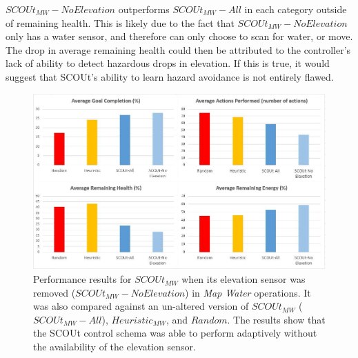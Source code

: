 \noindent
$SCOUt_{MW} - No Elevation$ outperforms $SCOUt_{MW} - All$ in each category outside of remaining health.
This is likely due to the fact that $SCOUt_{MW} - No Elevation$ only has a water sensor, and therefore can only choose to scan for water, or move.
The drop in average remaining health could then be attributed to the controller's lack of ability to detect hazardous drops in elevation.
If this is true, it would suggest that SCOUt's ability to learn hazard avoidance is not entirely flawed.

\begin{figure}[H]
  \centering
  \includegraphics[width=1.0\columnwidth]{Figures/Results/Experiment2/SensorChange/MapWater.JPG}
  \caption[Experiment 2 - Sensor Set Changing Results: $SCOUt_{MW}$]{Performance results for $SCOUt_{MW}$ when its elevation sensor was removed ($SCOUt_{MW} - No Elevation$) in \textit{Map Water} operations. It was also compared against an un-altered version of $SCOUt_{MW}$ ($SCOUt_{MW} - All$), $Heuristic_{MW}$, and $Random$. The results show that the SCOUt control schema was able to perform adaptively without the availability of the elevation sensor.}
  \label{fig:change_sensors_mapwater}
\end{figure}

